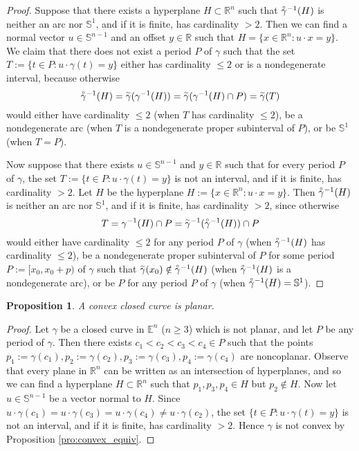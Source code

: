 \documentclass{amsart}
\newtheorem{proposition}{Proposition}[section]
\theoremstyle{definition}
\theoremstyle{remark}
\newcommand{\lring}[1]{\accentset{\circ}{#1}}
\newcommand{\ltilde}[1]{\accentset{\sim}{#1}}
\begin{document}
\begin{proof}
    Suppose that there exists a hyperplane $H\subset\mathbb{R}^n$
    such that $\lring{\gamma}^{-1}(H)$ is neither an arc
    nor $\mathbb{S}^1$, and if it is finite, has cardinality $>2$.
    Then we can find a normal vector $u\in\mathbb{S}^{n-1}$ and an
    offset $y\in\mathbb{R}$ such that
    $H=\{x\in\mathbb{R}^n:u\cdot x=y\}$.
    We claim that there does not exist a period $P$ of $\gamma$
    such that the set $T:=\{t\in P:u\cdot\gamma(t)=y\}$
    either has cardinality $\le2$ or is a nondegenerate interval,
    because otherwise
    \[\lring{\gamma}^{-1}(H)
        =\ltilde{\gamma}(\gamma^{-1}(H))
        =\ltilde{\gamma}(\gamma^{-1}(H)\cap P)
        =\ltilde{\gamma}(T)\]
    would either have cardinality $\le2$
    (when $T$ has cardinality $\le2$),
    be a nondegenerate arc (when $T$ is a nondegenerate
    proper subinterval of $P$),
    or be $\mathbb{S}^1$ (when $T=P$).

    Now suppose that there exists $u\in\mathbb{S}^{n-1}$ and
    $y\in\mathbb{R}$ such that for every period $P$ of $\gamma$,
    the set $T:=\{t\in P:u\cdot\gamma(t)=y\}$ is not an interval,
    and if it is finite, has cardinality $>2$.
    Let $H$ be the hyperplane $H:=\{x\in\mathbb{R}^n:u\cdot x=y\}$.
    Then $\lring{\gamma}^{-1}(H)$ is neither an arc nor
    $\mathbb{S}^1$, and if it is finite, has cardinality $>2$,
    since otherwise \[T=\gamma^{-1}(H)\cap P
        =\ltilde{\gamma}^{-1}(\lring{\gamma}^{-1}(H))\cap P\]
    would either have cardinality $\le2$ for any period $P$ of
    $\gamma$ (when $\lring{\gamma}^{-1}(H)$ has cardinality $\le2$),
    be a nondegenerate proper subinterval of $P$ for some period
    $P:=[x_0,x_0+p)$ of $\gamma$ such that
    $\ltilde{\gamma}(x_0)\notin\lring{\gamma}^{-1}(H)$
    (when $\lring{\gamma}^{-1}(H)$ is a nondegenerate arc),
    or be $P$ for any period $P$ of $\gamma$
    (when $\lring{\gamma}^{-1}(H)=\mathbb{S}^1$).
\end{proof}

\begin{proposition}
    \label{pro:convex_planar}
    A convex closed curve is planar.
\end{proposition}

\begin{proof}
    Let $\gamma$ be a closed curve in $\mathbb{E}^n$ ($n\ge 3$) which
    is not planar, and let $P$ be any period of $\gamma$.
    Then there exists $c_1<c_2<c_3<c_4\in P$ such that the points
    $p_1:=\gamma(c_1),p_2:=\gamma(c_2),
        p_3:=\gamma(c_3),p_4:=\gamma(c_4)$
    are noncoplanar. Observe that every plane in $\mathbb{R}^n$
    can be written as an intersection of hyperplanes, and so
    we can find a hyperplane $H\subset\mathbb{R}^n$
    such that $p_1,p_3,p_4\in H$ but $p_2\notin H$. Now let
    $u\in\mathbb{S}^{n-1}$ be a vector normal to $H$. Since
    $u\cdot\gamma(c_1)=u\cdot\gamma(c_3)=u\cdot\gamma(c_4)
        \ne u\cdot\gamma(c_2)$,
    the set $\{t\in P:u\cdot\gamma(t)=y\}$ is not an interval,
    and if it is finite, has cardinality $>2$. Hence $\gamma$
    is not convex by Proposition \ref{pro:convex_equiv}.
\end{proof}
\end{document}
